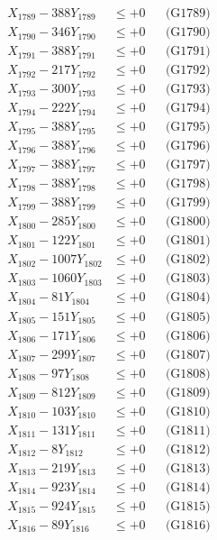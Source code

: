 \documentclass[a4paper,10pt]{article}
\begin{document}
{\begin{align}
X_{1789} - 388Y_{1789} &\leq +0 && \text{(G1789)} \\
X_{1790} - 346Y_{1790} &\leq +0 && \text{(G1790)} \\
\allowbreak
X_{1791} - 388Y_{1791} &\leq +0 && \text{(G1791)} \\
X_{1792} - 217Y_{1792} &\leq +0 && \text{(G1792)} \\
X_{1793} - 300Y_{1793} &\leq +0 && \text{(G1793)} \\
X_{1794} - 222Y_{1794} &\leq +0 && \text{(G1794)} \\
X_{1795} - 388Y_{1795} &\leq +0 && \text{(G1795)} \\
X_{1796} - 388Y_{1796} &\leq +0 && \text{(G1796)} \\
X_{1797} - 388Y_{1797} &\leq +0 && \text{(G1797)} \\
X_{1798} - 388Y_{1798} &\leq +0 && \text{(G1798)} \\
X_{1799} - 388Y_{1799} &\leq +0 && \text{(G1799)} \\
X_{1800} - 285Y_{1800} &\leq +0 && \text{(G1800)} \\
\allowbreak
X_{1801} - 122Y_{1801} &\leq +0 && \text{(G1801)} \\
X_{1802} - 1007Y_{1802} &\leq +0 && \text{(G1802)} \\
X_{1803} - 1060Y_{1803} &\leq +0 && \text{(G1803)} \\
X_{1804} - 81Y_{1804} &\leq +0 && \text{(G1804)} \\
X_{1805} - 151Y_{1805} &\leq +0 && \text{(G1805)} \\
X_{1806} - 171Y_{1806} &\leq +0 && \text{(G1806)} \\
X_{1807} - 299Y_{1807} &\leq +0 && \text{(G1807)} \\
X_{1808} - 97Y_{1808} &\leq +0 && \text{(G1808)} \\
X_{1809} - 812Y_{1809} &\leq +0 && \text{(G1809)} \\
X_{1810} - 103Y_{1810} &\leq +0 && \text{(G1810)} \\
\allowbreak
X_{1811} - 131Y_{1811} &\leq +0 && \text{(G1811)} \\
X_{1812} - 8Y_{1812} &\leq +0 && \text{(G1812)} \\
X_{1813} - 219Y_{1813} &\leq +0 && \text{(G1813)} \\
X_{1814} - 923Y_{1814} &\leq +0 && \text{(G1814)} \\
X_{1815} - 924Y_{1815} &\leq +0 && \text{(G1815)} \\
X_{1816} - 89Y_{1816} &\leq +0 && \text{(G1816)} \\

\end{align}}
\end{document}
